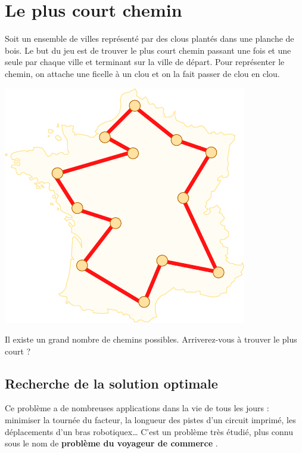 \chapter*{Le plus court chemin}

Soit un ensemble de villes représenté par des clous plantés dans une planche de bois. Le but du jeu est de trouver le plus court chemin passant une fois et une seule par chaque ville et terminant sur la ville de départ. Pour représenter le chemin, on attache une ficelle à un clou et on la fait passer de clou en clou.

\begin{center}
  \includegraphics[width=0.5\linewidth]{img/tsp.pdf}
  \label{img:tsp}
\end{center}


Il existe un grand nombre de chemins possibles. Arriverez-vous à trouver le plus court ?

\newpage

\section*{Recherche de la solution optimale}

Ce problème a de nombreuses applications dans la vie de tous les jours :
minimiser la tournée du facteur, la longueur des pistes d'un circuit imprimé,
les déplacements d'un bras robotiquex{\ldots} C'est un problème très étudié, plus connu sous le nom de \textbf{\og problème du voyageur de commerce \fg}.

